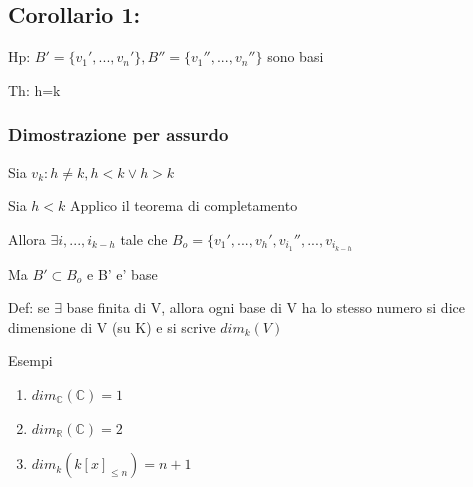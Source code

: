 \documentclass{article}
\begin{document}
\subsection*{Corollario 1:}
\begin{flushleft}
	Hp: $B' = \{ v_1',...,v_n' \},B'' = \{ v_1'',...,v_n'' \}$ sono basi
\end{flushleft}
\begin{flushleft}
	Th: h=k
\end{flushleft}
\subsubsection*{Dimostrazione per assurdo}
Sia $v_k : h\neq k, h<k \lor h>k$
\begin{flushleft}
	Sia $h<k$ Applico il teorema di completamento
\end{flushleft}
\begin{flushleft}
	Allora $\exists i,...,i_{k-h}$ tale che $B_o = \{ v_1',...,v_h',v_{i_1}'',...,v_{i_{k-h}}$
\end{flushleft}
\begin{flushleft}
	Ma $B' \subset B_o$ e B' e' base
\end{flushleft}
\begin{flushleft}
	Def: se $\exists$ base finita di V, allora ogni base di V ha lo stesso numero si dice dimensione di V (su K) e si scrive $dim_k(V)$
\end{flushleft}
Esempi
\begin{enumerate}
	\item $dim_{\mathbb{C}}(\mathbb{C})=1$
	\item $dim_{\mathbb{R}}(\mathbb{C})=2$
	\item $dim_k(k[x]_{\leq n})=n+1$
\end{enumerate}
\end{document}
